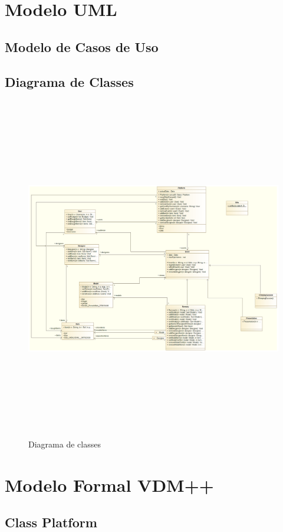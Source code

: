 \documentclass{article}
\begin{document}
\section{Modelo UML}
\subsection{Modelo de Casos de Uso}
\subsection{Diagrama de Classes}
\begin{figure}[H]
\centering
\includegraphics[width=160mm,height=150mm]{./images/class_diagram.png}
\caption{Diagrama de classes}
\label{fig:method}
\end{figure}
		
\section{Modelo Formal VDM++}
\subsection{Class Platform}
\end{document}
